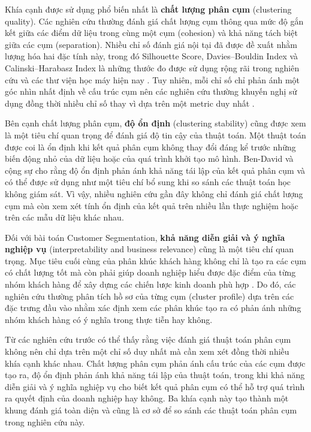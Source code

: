 \documentclass[12pt]{ai_conquer2026}
\begin{document}
Khía cạnh được sử dụng phổ biến nhất là \textbf{chất lượng phân cụm} (clustering quality). Các nghiên cứu thường đánh giá chất lượng cụm thông qua mức độ gắn kết giữa các điểm dữ liệu trong cùng một cụm (cohesion) và khả năng tách biệt giữa các cụm (separation). Nhiều chỉ số đánh giá nội tại đã được đề xuất nhằm lượng hóa hai đặc tính này, trong đó Silhouette Score, Davies--Bouldin Index và Calinski--Harabasz Index là những thước đo được sử dụng rộng rãi trong nghiên cứu và các thư viện học máy hiện nay \cite{Rousseeuw1987,Davies1979,Calinski1974}. Tuy nhiên, mỗi chỉ số chỉ phản ánh một góc nhìn nhất định về cấu trúc cụm nên các nghiên cứu thường khuyến nghị sử dụng đồng thời nhiều chỉ số thay vì dựa trên một metric duy nhất \cite{Arbelaitz2013,Validity2021}.

Bên cạnh chất lượng phân cụm, \textbf{độ ổn định} (clustering stability) cũng được xem là một tiêu chí quan trọng để đánh giá độ tin cậy của thuật toán. Một thuật toán được coi là ổn định khi kết quả phân cụm không thay đổi đáng kể trước những biến động nhỏ của dữ liệu hoặc của quá trình khởi tạo mô hình. Ben-David và cộng sự \cite{BenDavid2006} cho rằng độ ổn định phản ánh khả năng tái lập của kết quả phân cụm và có thể được sử dụng như một tiêu chí bổ sung khi so sánh các thuật toán học không giám sát. Vì vậy, nhiều nghiên cứu gần đây không chỉ đánh giá chất lượng cụm mà còn xem xét tính ổn định của kết quả trên nhiều lần thực nghiệm hoặc trên các mẫu dữ liệu khác nhau.

Đối với bài toán Customer Segmentation, \textbf{khả năng diễn giải và ý nghĩa nghiệp vụ} (interpretability and business relevance) cũng là một tiêu chí quan trọng. Mục tiêu cuối cùng của phân khúc khách hàng không chỉ là tạo ra các cụm có chất lượng tốt mà còn phải giúp doanh nghiệp hiểu được đặc điểm của từng nhóm khách hàng để xây dựng các chiến lược kinh doanh phù hợp \cite{Gomes2023}. Do đó, các nghiên cứu thường phân tích hồ sơ của từng cụm (cluster profile) dựa trên các đặc trưng đầu vào nhằm xác định xem các phân khúc tạo ra có phản ánh những nhóm khách hàng có ý nghĩa trong thực tiễn hay không.

Từ các nghiên cứu trước có thể thấy rằng việc đánh giá thuật toán phân cụm không nên chỉ dựa trên một chỉ số duy nhất mà cần xem xét đồng thời nhiều khía cạnh khác nhau. Chất lượng phân cụm phản ánh cấu trúc của các cụm được tạo ra, độ ổn định phản ánh khả năng tái lập của thuật toán, trong khi khả năng diễn giải và ý nghĩa nghiệp vụ cho biết kết quả phân cụm có thể hỗ trợ quá trình ra quyết định của doanh nghiệp hay không. Ba khía cạnh này tạo thành một khung đánh giá toàn diện và cũng là cơ sở để so sánh các thuật toán phân cụm trong nghiên cứu này.
\end{document}
